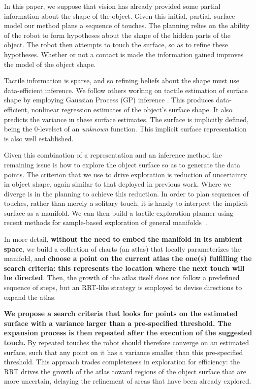 In this paper, we suppose that vision has already provided some partial information about the shape of the object. Given this initial, partial, surface model our method plans a  sequence of touches. The planning relies on the ability of the robot to form hypotheses about the shape of the hidden parts of the object. The robot then attempts to touch the surface, so as to refine these hypotheses. Whether or not a contact is made the information gained improves the model of the object shape.

Tactile information is sparse, and so refining beliefs about the shape must use data-efficient inference. We follow others working on tactile estimation of surface shape \cite{Dragiev2011Gaussian,Bjorkman2013Enhancing,Sommer2014Bimanual} by employing Gaussian Process (GP) inference \cite{Rasmussen2006Gaussian}.  This produces data-efficient, nonlinear regression estimates of the object's surface shape. It also predicts the variance in these surface estimates. The surface is implicitly defined, being the $0$-levelset of an \emph{unknown} function. This implicit surface representation is also well established.

Given this combination of a representation and an inference method the remaining issue is how to explore the object surface so as to generate the data points. The criterion that we use to drive exploration is reduction of uncertainty in object shape, again similar to that deployed in previous work. Where we diverge is in the planning to achieve this reduction. In order to plan sequences of touches, rather than merely a solitary touch, it is handy to interpret the implicit surface as a manifold. We can then build a tactile exploration planner using recent methods for sample-based exploration of general manifolds~\cite{Jaillet2013Path}. 

In more detail, {\bf without the need to embed the manifold in its ambient space}, we build a collection of charts (an atlas) that locally parameterizes the manifold, and {\bf choose a point on the current atlas the one(s) fulfilling the search criteria: this represents the location where the next touch will be directed}. Then, the growth of the atlas itself does not follow a predefined sequence of steps, but an RRT-like strategy is employed to devise directions to expand the atlas.

{\bf We propose a search criteria that looks for points on the estimated surface with a variance larger than a pre-specified threshold. The expansion process is then repeated after the execution of the suggested touch.} By repeated touches the robot should therefore converge on an estimated surface, such that any point on it has a variance smaller than this pre-specified threshold. This approach trades completeness in exploration for efficiency: the RRT drives the growth of the atlas toward regions of the object surface that are more uncertain, delaying the refinement of areas that have been already explored.


